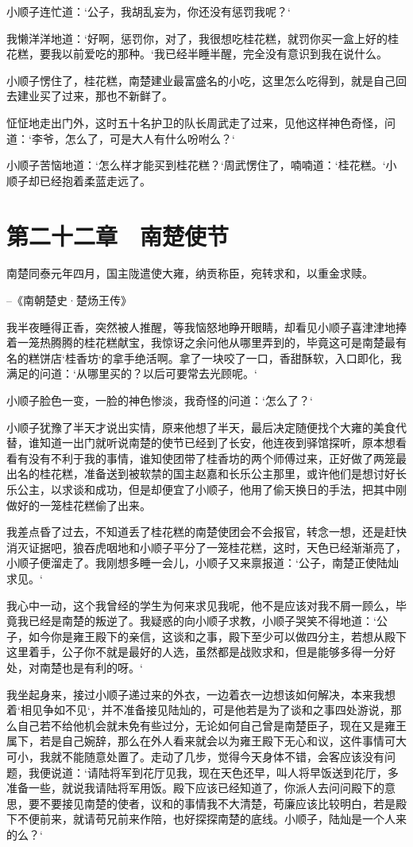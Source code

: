 小顺子连忙道：‘公子，我胡乱妄为，你还没有惩罚我呢？‘

我懒洋洋地道：‘好啊，惩罚你，对了，我很想吃桂花糕，就罚你买一盒上好的桂花糕，要我以前爱吃的那种。‘我已经半睡半醒，完全没有意识到我在说什么。

小顺子愣住了，桂花糕，南楚建业最富盛名的小吃，这里怎么吃得到，就是自己回去建业买了过来，那也不新鲜了。

怔怔地走出门外，这时五十名护卫的队长周武走了过来，见他这样神色奇怪，问道：‘李爷，怎么了，可是大人有什么吩咐么？‘

小顺子苦恼地道：‘怎么样才能买到桂花糕？‘周武愣住了，喃喃道：‘桂花糕。‘小顺子却已经抱着柔蓝走远了。

\chapter{第二十二章　南楚使节}

南楚同泰元年四月，国主陇遣使大雍，纳贡称臣，宛转求和，以重金求赎。

--《南朝楚史·楚炀王传》

我半夜睡得正香，突然被人推醒，等我恼怒地睁开眼睛，却看见小顺子喜津津地捧着一笼热腾腾的桂花糕献宝，我惊讶之余问他从哪里弄到的，毕竟这可是南楚最有名的糕饼店‘桂香坊‘的拿手绝活啊。拿了一块咬了一口，香甜酥软，入口即化，我满足的问道：‘从哪里买的？以后可要常去光顾呢。‘

小顺子脸色一变，一脸的神色惨淡，我奇怪的问道：‘怎么了？‘

小顺子犹豫了半天才说出实情，原来他想了半天，最后决定随便找个大雍的美食代替，谁知道一出门就听说南楚的使节已经到了长安，他连夜到驿馆探听，原本想看看有没有不利于我的事情，谁知使团带了桂香坊的两个师傅过来，正好做了两笼最出名的桂花糕，准备送到被软禁的国主赵嘉和长乐公主那里，或许他们是想讨好长乐公主，以求谈和成功，但是却便宜了小顺子，他用了偷天换日的手法，把其中刚做好的一笼桂花糕偷了出来。

我差点昏了过去，不知道丢了桂花糕的南楚使团会不会报官，转念一想，还是赶快消灭证据吧，狼吞虎咽地和小顺子平分了一笼桂花糕，这时，天色已经渐渐亮了，小顺子便溜走了。我刚想多睡一会儿，小顺子又来禀报道：‘公子，南楚正使陆灿求见。‘

我心中一动，这个我曾经的学生为何来求见我呢，他不是应该对我不屑一顾么，毕竟我已经是南楚的叛逆了。我疑惑的向小顺子求教，小顺子哭笑不得地道：‘公子，如今你是雍王殿下的亲信，这谈和之事，殿下至少可以做四分主，若想从殿下这里着手，公子你不就是最好的人选，虽然都是战败求和，但是能够多得一分好处，对南楚也是有利的呀。‘

我坐起身来，接过小顺子递过来的外衣，一边着衣一边想该如何解决，本来我想着‘相见争如不见‘，并不准备接见陆灿的，可是他若是为了谈和之事四处游说，那么自己若不给他机会就未免有些过分，无论如何自己曾是南楚臣子，现在又是雍王属下，若是自己婉辞，那么在外人看来就会以为雍王殿下无心和议，这件事情可大可小，我就不能随意处置了。走动了几步，觉得今天身体不错，会客应该没有问题，我便说道：‘请陆将军到花厅见我，现在天色还早，叫人将早饭送到花厅，多准备一些，就说我请陆将军用饭。殿下应该已经知道了，你派人去问问殿下的意思，要不要接见南楚的使者，议和的事情我不大清楚，苟廉应该比较明白，若是殿下不便前来，就请苟兄前来作陪，也好探探南楚的底线。小顺子，陆灿是一个人来的么？‘

